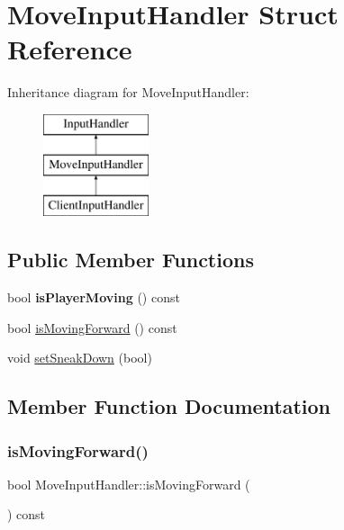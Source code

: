 \hypertarget{struct_move_input_handler}{}\section{Move\+Input\+Handler Struct Reference}
\label{struct_move_input_handler}
Inheritance diagram for Move\+Input\+Handler\+:\begin{figure}[H]
\begin{center}
\leavevmode
\includegraphics[height=3.000000cm]{struct_move_input_handler}
\end{center}
\end{figure}
\subsection*{Public Member Functions}
\begin{DoxyCompactItemize}
\item 
\mbox{\label{struct_move_input_handler_a2a4bbd6d2f5d69dcc9bb5b49cc1fd813}} 
bool {\bfseries is\+Player\+Moving} () const
\item 
bool \mbox{\hyperlink{struct_move_input_handler_a7e90841b70ab89985432260f56be66c6}{is\+Moving\+Forward}} () const
\item 
void \mbox{\hyperlink{struct_move_input_handler_a407a746a068a08e0e13942256ac28332}{set\+Sneak\+Down}} (bool)
\end{DoxyCompactItemize}


\subsection{Member Function Documentation}
\mbox{\label{struct_move_input_handler_a7e90841b70ab89985432260f56be66c6}} 
\subsubsection{\texorpdfstring{isMovingForward()}{isMovingForward()}}
{\footnotesize\ttfamily bool Move\+Input\+Handler\+::is\+Moving\+Forward (\begin{DoxyParamCaption}{ }\end{DoxyParamCaption}) const}

